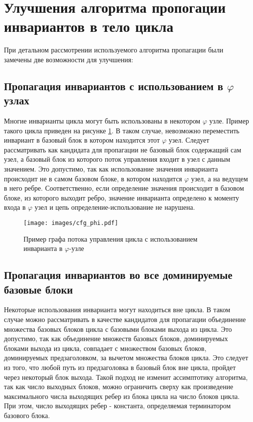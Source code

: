 \section{Улучшения алгоритма пропогации инвариантов в тело цикла}

При детальном рассмотрении используемого алгоритма пропагации были замечены две возможности для улучшения:

\subsection{Пропагация инвариантов с использованием в $\varphi$ узлах}

Многие инварианты цикла могут быть использованы в некотором $\varphi$ узле.
Пример такого цикла приведен на рисунке \ref{fig:cfg_phi}.
В таком случае, невозможно переместить инвариант в базовый блок в котором находится этот $\varphi$ узел.
Следует рассматривать как кандидата для пропагации не базовый блок содержащий сам узел, а базовый блок из которого поток управления входит в узел с данным значением.
Это допустимо, так как использование значения инварианта происходит не в самом базовом блоке, в котором находится $\varphi$ узел, а на ведущем в него ребре.
Соответственно, если определение значения происходит в базовом блоке, из которого выходит ребро, значение инварианта определено к моменту входа в $\varphi$ узел и цепь определение-использование не нарушена.

\begin{figure}
    \centering
    \texttt{[image: images/cfg\_phi.pdf]}
    \caption{Пример графа потока управления цикла с использованием инварианта в $\varphi$-узле}
    \label{fig:cfg_phi}
\end{figure}

\subsection{Пропагация инвариантов во все доминируемые базовые блоки}

Некоторые использования инварианта могут находиться вне цикла.
В таком случае можно рассматривать в качестве кандидатов для пропагации объединение множества базовых блоков цикла с базовыми блоками выхода из цикла.
Это допустимо, так как объединение множеств базовых блоков, доминируемых блоками выхода из цикла, совпадает с множеством базовых блоков, доминируемых предзаголовком, за вычетом множества блоков цикла.
Это следует из того, что любой путь из предзаголовка в базовый блок вне цикла, пройдет через некоторый блок выхода.
Такой подход не изменит ассимптотику алгоритма, так как число выходных блоков, можно ограничить сверху как произведение максимального числа выходящих ребер из блока цикла на число блоков цикла.
При этом, число выходящих ребер - константа, определяемая терминатором базового блока.

